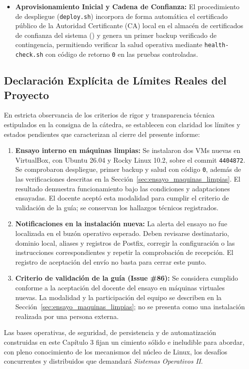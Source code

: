 \documentclass[10pt,a4paper]{article}
\begin{document}
\begin{itemize}[leftmargin=*]
    \item \textbf{Aprovisionamiento Inicial y Cadena de Confianza:} El procedimiento de despliegue (\texttt{deploy.sh}) incorpora de forma automática el certificado público de la Autoridad Certificante (CA) local en el almacén de certificados de confianza del sistema () y genera un primer backup verificado de contingencia, permitiendo verificar la salud operativa mediante \texttt{health-check.sh} con código de retorno \texttt{0} en las pruebas controladas.
\end{itemize}

\subsection{Declaración Explícita de Límites Reales del Proyecto}

En estricta observancia de los criterios de rigor y transparencia técnica estipulados en la consigna de la cátedra, se establecen con claridad los límites y estados pendientes que caracterizan al cierre del presente informe:

\begin{enumerate}[leftmargin=*]
    \item \textbf{Ensayo interno en máquinas limpias:} Se instalaron dos VMs nuevas en VirtualBox, con Ubuntu 26.04 y Rocky Linux 10.2, sobre el commit \texttt{4404872}. Se comprobaron despliegue, primer backup y salud con código \texttt{0}, además de las verificaciones descritas en la Sección~\ref{sec:ensayo_maquinas_limpias}. El resultado demuestra funcionamiento bajo las condiciones y adaptaciones ensayadas. El docente aceptó esta modalidad para cumplir el criterio de validación de la guía; se conservan los hallazgos técnicos registrados.
    \item \textbf{Notificaciones en la instalación nueva:} La alerta del ensayo no fue localizada en el buzón operativo esperado. Deben revisarse destinatario, dominio local, aliases y registros de Postfix, corregir la configuración o las instrucciones correspondientes y repetir la comprobación de recepción. El registro de aceptación del envío no basta para cerrar este punto.
    \item \textbf{Criterio de validación de la guía (Issue \#86):} Se considera cumplido conforme a la aceptación del docente del ensayo en máquinas virtuales nuevas. La modalidad y la participación del equipo se describen en la Sección~\ref{sec:ensayo_maquinas_limpias}; no se presenta como una instalación realizada por una persona externa.
\end{enumerate}

Las bases operativas, de seguridad, de persistencia y de automatización construidas en este Capítulo 3 fijan un cimiento sólido e ineludible para abordar, con pleno conocimiento de los mecanismos del núcleo de Linux, los desafíos concurrentes y distribuidos que demandará \textit{Sistemas Operativos II}.
\end{document}
